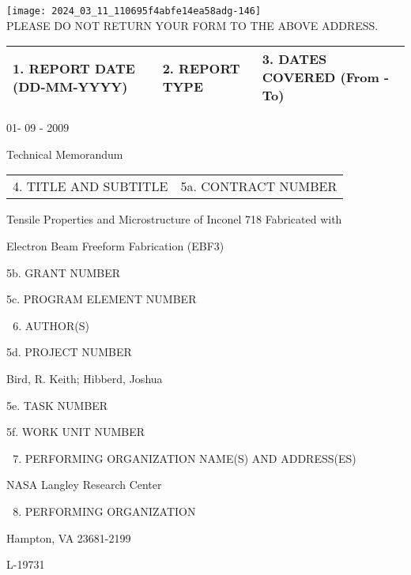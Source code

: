 \documentclass[10pt]{article}
\begin{document}
\texttt{[image: 2024\_03\_11\_110695f4abfe14ea58adg-146]}\\
PLEASE DO NOT RETURN YOUR FORM TO THE ABOVE ADDRESS.

\begin{center}
\begin{tabular}{|l|l|l|}
\hline
1. REPORT DATE (DD-MM-YYYY) & 2. REPORT TYPE & 3. DATES COVERED (From - To) \\
\hline
\end{tabular}
\end{center}

01- 09 - 2009

Technical Memorandum

\begin{center}
\begin{tabular}{|l|l|}
4. TITLE AND SUBTITLE & 5a. CONTRACT NUMBER \\
\end{tabular}
\end{center}

Tensile Properties and Microstructure of Inconel 718 Fabricated with

Electron Beam Freeform Fabrication (EBF3)

5b. GRANT NUMBER

5c. PROGRAM ELEMENT NUMBER

\begin{enumerate}
  \setcounter{enumi}{5}
  \item AUTHOR(S)
\end{enumerate}

5d. PROJECT NUMBER

Bird, R. Keith; Hibberd, Joshua

5e. TASK NUMBER

5f. WORK UNIT NUMBER

\begin{enumerate}
  \setcounter{enumi}{6}
  \item PERFORMING ORGANIZATION NAME(S) AND ADDRESS(ES)
\end{enumerate}

NASA Langley Research Center

\begin{enumerate}
  \setcounter{enumi}{7}
  \item PERFORMING ORGANIZATION
\end{enumerate}

Hampton, VA 23681-2199

L-19731
\end{document}

